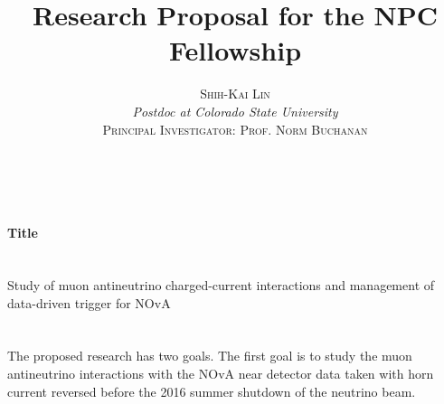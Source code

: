\documentclass[a4paper, 11pt]{article} %
\title{\textbf{Research Proposal for the NPC Fellowship}\\ %
} %
\author{\textsc{Shih-Kai Lin} %
\\{\textit{Postdoc at Colorado State University}} %
\\{\textsc{Principal Investigator: Prof. Norm Buchanan}}}
\date{} %
\makeatletter
\renewcommand{\maketitle}{ %
\begin{flushright} %
{\LARGE\@title} %

\vspace{50pt} %

{\large\@author} %
\\\@date %

\vspace{40pt} %
\end{flushright}
}
\makeatother
\begin{document}
\maketitle %



%
%

\paragraph{\textbf{Title}}\hspace*{\fill}\\
Study of muon antineutrino charged-current interactions and management of data-driven trigger for NOvA

\paragraph{}\hspace*{\fill}\\
The proposed research has two goals. The first goal is to study the muon antineutrino interactions with the NOvA near detector data taken with horn current reversed before the 2016 summer shutdown of the neutrino beam.
\end{document}
